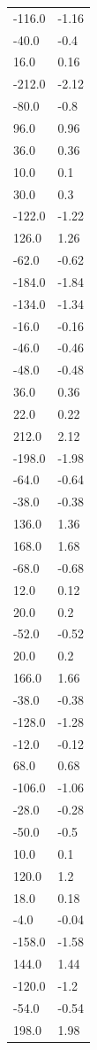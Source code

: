 \begin{longtable}{ll}
-116.0 & -1.16 \\
-40.0 & -0.4 \\
16.0 & 0.16 \\
-212.0 & -2.12 \\
-80.0 & -0.8 \\
96.0 & 0.96 \\
36.0 & 0.36 \\
10.0 & 0.1 \\
30.0 & 0.3 \\
-122.0 & -1.22 \\
126.0 & 1.26 \\
-62.0 & -0.62 \\
-184.0 & -1.84 \\
-134.0 & -1.34 \\
-16.0 & -0.16 \\
-46.0 & -0.46 \\
-48.0 & -0.48 \\
36.0 & 0.36 \\
22.0 & 0.22 \\
212.0 & 2.12 \\
-198.0 & -1.98 \\
-64.0 & -0.64 \\
-38.0 & -0.38 \\
136.0 & 1.36 \\
168.0 & 1.68 \\
-68.0 & -0.68 \\
12.0 & 0.12 \\
20.0 & 0.2 \\
-52.0 & -0.52 \\
20.0 & 0.2 \\
166.0 & 1.66 \\
-38.0 & -0.38 \\
-128.0 & -1.28 \\
-12.0 & -0.12 \\
68.0 & 0.68 \\
-106.0 & -1.06 \\
-28.0 & -0.28 \\
-50.0 & -0.5 \\
10.0 & 0.1 \\
120.0 & 1.2 \\
18.0 & 0.18 \\
-4.0 & -0.04 \\
-158.0 & -1.58 \\
144.0 & 1.44 \\
-120.0 & -1.2 \\
-54.0 & -0.54 \\
198.0 & 1.98 \\

\end{longtable}
